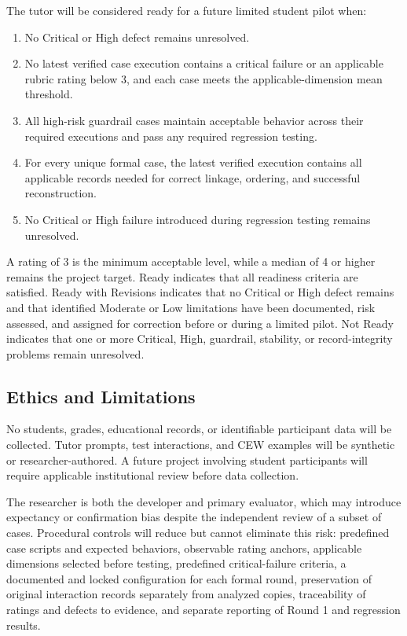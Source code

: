 \documentclass[conference]{IEEEtran}
\begin{document}
The tutor will be considered ready for a future limited student pilot
when:
\begin{enumerate}
\item No Critical or High defect remains unresolved.
\item No latest verified case execution contains a critical failure or an
applicable rubric rating below 3, and each case meets the applicable-dimension mean threshold.
\item All high-risk guardrail cases maintain acceptable behavior across
their required executions and pass any required regression testing.
\item For every unique formal case, the latest verified execution contains
all applicable records needed for correct linkage, ordering, and successful
reconstruction.
\item No Critical or High failure introduced during regression testing
remains unresolved.
\end{enumerate}
A rating of 3 is the minimum acceptable level, while a median of 4 or
higher remains the project target. Ready indicates that all readiness
criteria are satisfied. Ready with Revisions indicates that no Critical
or High defect remains and that identified Moderate or Low limitations
have been documented, risk assessed, and assigned for correction before
or during a limited pilot. Not Ready indicates that one or more Critical,
High, guardrail, stability, or record-integrity problems remain unresolved.

\subsection{Ethics and Limitations}

No students, grades, educational records, or identifiable participant
data will be collected. Tutor prompts, test interactions, and CEW
examples will be synthetic or researcher-authored. A future project
involving student participants will require applicable institutional
review before data collection.

The researcher is both the developer and primary evaluator, which may
introduce expectancy or confirmation bias despite the independent review of a subset of cases. Procedural controls will
reduce but cannot eliminate this risk: predefined case scripts and
expected behaviors, observable rating anchors, applicable dimensions
selected before testing, predefined critical-failure criteria, a documented
and locked configuration for each formal round, preservation of original
interaction records separately from analyzed copies, traceability of
ratings and defects to evidence, and separate reporting of Round 1 and
regression results.
\end{document}
